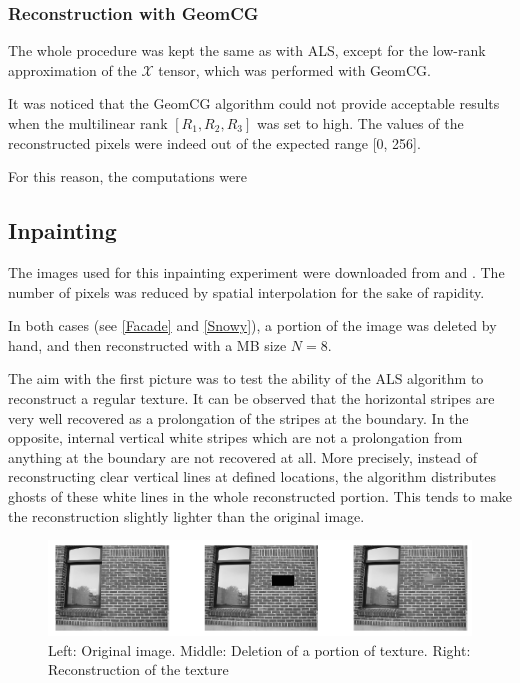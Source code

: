 \documentclass[a4paper, 11pt]{article} %
\def \X {\mathcal{X}}
\begin{document}
\subsubsection{Reconstruction with GeomCG}

The whole procedure was kept the same as with ALS, except for the low-rank approximation of the $\X$ tensor, which was performed with GeomCG.

It was noticed that the GeomCG algorithm could not provide acceptable results when the multilinear rank $[R_1,R_2, R_3]$ was set to high. The values of the reconstructed pixels were indeed out of the expected range [0, 256].

For this reason, the computations were 
\subsection{Inpainting}

The images used for this inpainting experiment were downloaded from \cite{facade} and \cite{snow}. The number of pixels was reduced by spatial interpolation for the sake of rapidity. 

In both cases (see \autoref{Facade} and \autoref{Snowy}), a portion of the image was deleted by hand, and then reconstructed with a MB size $N=8$.

The aim with the first picture was to test the ability of the ALS algorithm to reconstruct a regular texture. It can be observed that the horizontal stripes are very well recovered as a prolongation of the stripes at the boundary. In the opposite, internal vertical white stripes which are not a prolongation from anything at the boundary are not recovered at all. More precisely, instead of reconstructing clear vertical lines at defined locations, the algorithm distributes ghosts of these white lines in the whole reconstructed portion. This tends to make the reconstruction slightly lighter than the original image.
\begin{figure}[h!]
\centering
\includegraphics[scale=0.9]{InpaintingFacade}
\caption{Left: Original image. Middle: Deletion of a portion of texture. Right: Reconstruction of the texture\label{Facade}}
\end{figure}
\end{document}

